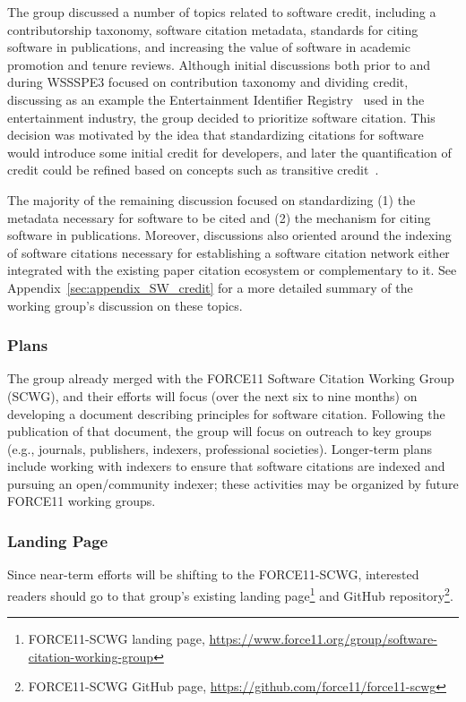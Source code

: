 The group discussed a number of topics related to software credit, including a
contributorship taxonomy, software citation metadata, standards for citing
software in publications, and increasing the value of software in academic
promotion and tenure reviews. Although initial discussions both prior to and
during WSSSPE3 focused on contribution taxonomy and dividing credit, discussing
as an example the Entertainment Identifier Registry~\cite{EIDR} used in the
entertainment industry, the group decided to prioritize software citation. This
decision was motivated by the idea that standardizing citations for software
would introduce some initial credit for developers, and later the quantification
of credit could be refined based on concepts such as transitive
credit~\cite{Katz:2014_tc,katz-smith-tc}.

The majority of the remaining discussion focused on standardizing (1) the
metadata necessary for software to be cited and (2) the mechanism for citing
software in publications. Moreover, discussions also oriented around the
indexing of software citations necessary for establishing a software citation
network either integrated with the existing paper citation ecosystem or
complementary to it. See Appendix~\ref{sec:appendix_SW_credit} for a more
detailed summary of the working group's discussion on these topics.

\subsubsection{Plans}

The group already merged with the FORCE11 Software Citation Working Group
(SCWG), and their efforts will focus (over the next six to nine months) on
developing a document describing principles for software citation. Following the
publication of that document, the group will focus on outreach to key
groups (e.g., journals, publishers, indexers, professional societies).
Longer-term plans include working with indexers to ensure that software
citations are indexed and pursuing an open\slash community indexer; these
activities may be organized by future FORCE11 working groups.

\subsubsection{Landing Page}

Since near-term efforts will be shifting to the FORCE11-SCWG, 
interested readers should go to that group's existing landing page\footnote{FORCE11-SCWG
landing page,
\url{https://www.force11.org/group/software-citation-working-group}} and GitHub
repository\footnote{FORCE11-SCWG GitHub page,
\url{https://github.com/force11/force11-scwg}}.
